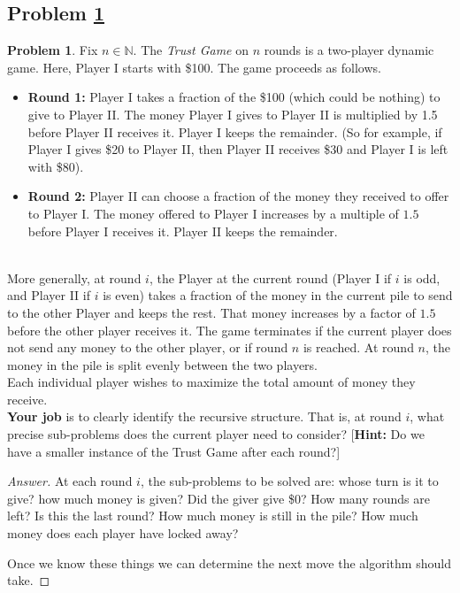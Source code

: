 \documentclass[11pt]{article}
\theoremstyle{definition}
\theoremstyle{definition}
\newtheorem{required}{Problem}
\theoremstyle{definition}
\begin{document}
\subsection{Problem \ref{DP2}}
\begin{required} \label{DP2}
Fix $n \in \mathbb{N}$. The \textit{Trust Game} on $n$ rounds is a two-player dynamic game. Here, Player I starts with \$100. The game proceeds as follows.
\begin{itemize}
\item \textbf{Round 1:} Player I takes a fraction of the \$100 (which could be nothing) to give to Player II. The money Player I gives to Player II is multiplied by 1.5 before Player II receives it. Player I keeps the remainder. (So for example, if Player I gives \$20 to Player II, then Player II receives \$30 and Player I is left with \$80).

\item \textbf{Round 2:} Player II can choose a fraction of the money they received to offer to Player I. The money offered to Player I increases by a multiple of $1.5$  before Player I receives it. Player II keeps the remainder.
\end{itemize}

\noindent \\ More generally, at round $i$, the Player at the current round (Player I if $i$ is odd, and Player II if $i$ is even) takes a fraction of the money in the current pile to send to the other Player and keeps the rest. That money increases by a factor of $1.5$ before the other player receives it. The game terminates if the current player does not send any money to the other player, or if round $n$ is reached. At round $n$, the money in the pile is split evenly between the two players. \\

\noindent Each individual player wishes to maximize the total amount of money they receive. \\

\noindent \textbf{Your job} is to clearly identify the recursive structure. That is, at round $i$, what precise sub-problems does the current player need to consider? [\textbf{Hint:} Do we have a smaller instance of the Trust Game after each round?]
\end{required}

\begin{proof}[Answer]

At each round $i$, the sub-problems to be solved are: whose turn is it to give? how much money is given? Did the giver give \$0? How many rounds are left? Is this the last round? How much money is still in the pile? How much money does each player have locked away?


 Once we know these things we can determine the next move the algorithm should take. 


\end{proof}
\end{document}
